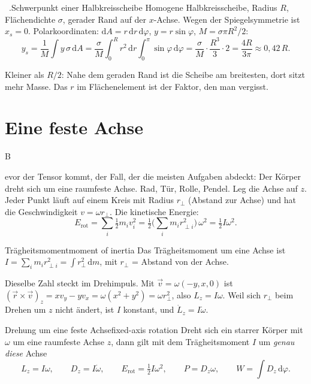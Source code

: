 \documentclass[deutsch]{kaelearn}
\makeatletter
\newcommand\dd{\mathrm{d}}
\newcommand\step[1]{\par\smallskip\noindent{\color{kldim}\pix{#1}}\quad}
\newenvironment{shortexample}[1]{\refstepcounter{klitem}\begin{panel}[unbreakable]{\kl@L@ex\ \kl@folio.\theklitem}{#1}{}}{\end{panel}}
\makeatother
\begin{document}
\begin{shortexample}{Schwerpunkt einer Halbkreisscheibe}
Homogene Halbkreisscheibe, Radius $R$, Flächendichte $\sigma$, gerader Rand auf der $x$-Achse. Wegen der Spiegelsymmetrie ist
$x_s = 0$. Polarkoordinaten: $\dd A = r\,\dd r\,\dd\varphi$, $y = r\sin\varphi$, $M = \sigma\pi R^2/2$:
\[
  y_s = \frac1M\int y\,\sigma\,\dd A = \frac\sigma M\int_0^R\!r^2\,\dd r\int_0^\pi\!\sin\varphi\,\dd\varphi
      = \frac\sigma M\cdot\frac{R^3}3\cdot2 = \frac{4R}{3\pi}\approx0{,}42\,R .
\]
\step{Rückschau} Kleiner als $R/2$: Nahe dem geraden Rand ist die Scheibe am breitesten, dort sitzt mehr Masse. Das $r$ im Flächenelement
ist der Faktor, den man vergisst.
\end{shortexample}

\section{Eine feste Achse}

\opening{B}{evor der} Tensor kommt, der Fall, der die meisten Aufgaben abdeckt: Der Körper dreht sich um eine raumfeste Achse. Rad,
Tür, Rolle, Pendel. Leg die Achse auf $z$. Jeder Punkt läuft auf einem Kreis mit Radius $r_\perp$ (Abstand zur Achse) und hat die
Geschwindigkeit $v = \omega r_\perp$. Die kinetische Energie:
\[
  E_{\mathrm{rot}} = \sum_i\tfrac12m_iv_i^2 = \tfrac12\Big(\sum_i m_ir_{\perp i}^2\Big)\,\omega^2 = \tfrac12I\omega^2 .
\]

\begin{definition}{Trägheitsmoment}{moment of inertia}
Das Trägheitsmoment um eine Achse ist $\displaystyle I = \sum_i m_ir_{\perp i}^2 = \int r_\perp^2\,\dd m$, mit $r_\perp$ = Abstand von
der Achse.
\end{definition}

Dieselbe Zahl steckt im Drehimpuls. Mit $\vec v = \omega(-y,x,0)$ ist $(\vec r\times\vec v)_z = xv_y-yv_x = \omega(x^2+y^2) = \omega r_\perp^2$,
also $L_z = I\omega$. Weil sich $r_\perp$ beim Drehen um $z$ nicht ändert, ist $I$ konstant, und $\dot L_z = I\dot\omega$.

\begin{theorem}{Drehung um eine feste Achse}{fixed-axis rotation}
Dreht sich ein starrer Körper mit $\omega$ um eine raumfeste Achse $z$, dann gilt mit dem Trägheitsmoment $I$ um \emph{genau diese} Achse
\[
  L_z = I\omega,\qquad D_z = I\dot\omega,\qquad E_{\mathrm{rot}} = \tfrac12I\omega^2,\qquad P = D_z\omega,\qquad W = \int D_z\,\dd\varphi .
\]
\end{theorem}
\end{document}
